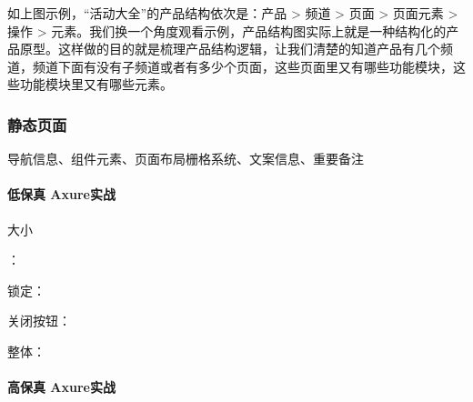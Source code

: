 \documentclass[letterpaper,11pt,english]{sphinxmanual}
\begin{document}
如上图示例，“活动大全”的产品结构依次是：产品 \sphinxhyphen{}> 频道 \sphinxhyphen{}> 页面 \sphinxhyphen{}> 页面元素
\sphinxhyphen{}> 操作 \sphinxhyphen{}>
元素。我们换一个角度观看示例，产品结构图实际上就是一种结构化的产品原型。这样做的目的就是梳理产品结构逻辑，让我们清楚的知道产品有几个频道，频道下面有没有子频道或者有多少个页面，这些页面里又有哪些功能模块，这些功能模块里又有哪些元素。


\subsubsection{静态页面}
\label{\detokenize{chapter_knowledge/static_page:id1}}\label{\detokenize{chapter_knowledge/static_page::doc}}
导航信息、组件元素、页面布局\sphinxhyphen{}栅格系统、文案信息、重要备注
%
\begin{footnote}[528]\sphinxAtStartFootnote
{}
%
\end{footnote}


\paragraph{低保真 Axure实战}
\label{\detokenize{chapter_knowledge/static_page:axure}}\label{\detokenize{chapter_knowledge/static_page:page-axure}}
大小 %
\begin{footnote}[529]\sphinxAtStartFootnote
{}
%
\end{footnote}：
\begin{center}\end{center}

锁定： \begin{center}\end{center}

关闭按钮： \begin{center}\end{center}

整体： \begin{center}\end{center}


\paragraph{高保真 Axure实战}
\label{\detokenize{chapter_knowledge/static_page:page-done-axure}}\label{\detokenize{chapter_knowledge/static_page:id2}}
\end{document}
